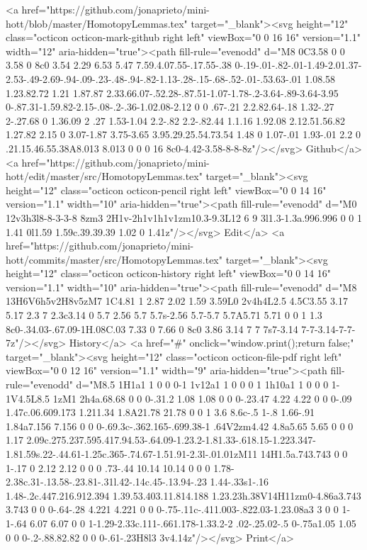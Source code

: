 {      <a href="https://github.com/jonaprieto/mini-hott/blob/master/HomotopyLemmas.tex" target="_blank"><svg height="12" class="octicon octicon-mark-github right left" viewBox="0 0 16 16" version="1.1" width="12" aria-hidden="true"><path fill-rule="evenodd" d="M8 0C3.58 0 0 3.58 0 8c0 3.54 2.29 6.53 5.47 7.59.4.07.55-.17.55-.38 0-.19-.01-.82-.01-1.49-2.01.37-2.53-.49-2.69-.94-.09-.23-.48-.94-.82-1.13-.28-.15-.68-.52-.01-.53.63-.01 1.08.58 1.23.82.72 1.21 1.87.87 2.33.66.07-.52.28-.87.51-1.07-1.78-.2-3.64-.89-3.64-3.95 0-.87.31-1.59.82-2.15-.08-.2-.36-1.02.08-2.12 0 0 .67-.21 2.2.82.64-.18 1.32-.27 2-.27.68 0 1.36.09 2 .27 1.53-1.04 2.2-.82 2.2-.82.44 1.1.16 1.92.08 2.12.51.56.82 1.27.82 2.15 0 3.07-1.87 3.75-3.65 3.95.29.25.54.73.54 1.48 0 1.07-.01 1.93-.01 2.2 0 .21.15.46.55.38A8.013 8.013 0 0 0 16 8c0-4.42-3.58-8-8-8z"/></svg> Github</a>
      <a href="https://github.com/jonaprieto/mini-hott/edit/master/src/HomotopyLemmas.tex" target="_blank"><svg height="12" class="octicon octicon-pencil right left" viewBox="0 0 14 16" version="1.1" width="10" aria-hidden="true"><path fill-rule="evenodd" d="M0 12v3h3l8-8-3-3-8 8zm3 2H1v-2h1v1h1v1zm10.3-9.3L12 6 9 3l1.3-1.3a.996.996 0 0 1 1.41 0l1.59 1.59c.39.39.39 1.02 0 1.41z"/></svg> Edit</a>
      <a href="https://github.com/jonaprieto/mini-hott/commits/master/src/HomotopyLemmas.tex" target="_blank"><svg height="12" class="octicon octicon-history right left" viewBox="0 0 14 16" version="1.1" width="10" aria-hidden="true"><path fill-rule="evenodd" d="M8 13H6V6h5v2H8v5zM7 1C4.81 1 2.87 2.02 1.59 3.59L0 2v4h4L2.5 4.5C3.55 3.17 5.17 2.3 7 2.3c3.14 0 5.7 2.56 5.7 5.7s-2.56 5.7-5.7 5.7A5.71 5.71 0 0 1 1.3 8c0-.34.03-.67.09-1H.08C.03 7.33 0 7.66 0 8c0 3.86 3.14 7 7 7s7-3.14 7-7-3.14-7-7-7z"/></svg> History</a>
      <a  href="#" onclick="window.print();return false;" target="_blank"><svg height="12" class="octicon octicon-file-pdf right left" viewBox="0 0 12 16" version="1.1" width="9" aria-hidden="true"><path fill-rule="evenodd" d="M8.5 1H1a1 1 0 0 0-1 1v12a1 1 0 0 0 1 1h10a1 1 0 0 0 1-1V4.5L8.5 1zM1 2h4a.68.68 0 0 0-.31.2 1.08 1.08 0 0 0-.23.47 4.22 4.22 0 0 0-.09 1.47c.06.609.173 1.211.34 1.8A21.78 21.78 0 0 1 3.6 8.6c-.5 1-.8 1.66-.91 1.84a7.156 7.156 0 0 0-.69.3c-.362.165-.699.38-1 .64V2zm4.42 4.8a5.65 5.65 0 0 0 1.17 2.09c.275.237.595.417.94.53-.64.09-1.23.2-1.81.33-.618.15-1.223.347-1.81.59s.22-.44.61-1.25c.365-.74.67-1.51.91-2.3l-.01.01zM11 14H1.5a.743.743 0 0 1-.17 0 2.12 2.12 0 0 0 .73-.44 10.14 10.14 0 0 0 1.78-2.38c.31-.13.58-.23.81-.31l.42-.14c.45-.13.94-.23 1.44-.33s1-.16 1.48-.2c.447.216.912.394 1.39.53.403.11.814.188 1.23.23h.38V14H11zm0-4.86a3.743 3.743 0 0 0-.64-.28 4.221 4.221 0 0 0-.75-.11c-.411.003-.822.03-1.23.08a3 3 0 0 1-1-.64 6.07 6.07 0 0 1-1.29-2.33c.111-.661.178-1.33.2-2 .02-.25.02-.5 0-.75a1.05 1.05 0 0 0-.2-.88.82.82 0 0 0-.61-.23H8l3 3v4.14z"/></svg> Print</a>
}

